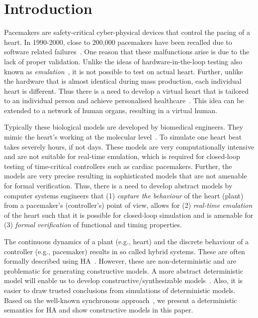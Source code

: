 \section{Introduction}

Pacemakers are safety-critical cyber-physical devices 
that control the pacing of a heart.
In 1990-2000, close to 200,000 pacemakers have been recalled
due to software related failures~\cite{alemzadeh13}.
 One reason that these malfunctions
arise is due to the lack of proper validation.
Unlike the ideas of hardware-in-the-loop testing
also known as \emph {emulation}~\cite{patel2015survey},
it is not possible to test on actual heart.
Further, unlike the hardware that is almost identical 
during mass production, each individual heart is different.
Thus there is a need to develop a virtual heart that is tailored
to an individual person and achieve
personalised healthcare~\cite{Trayanova2014}. 
This idea can be extended 
to a network of human organs, resulting in a virtual human.

Typically these biological  models are  developed by biomedical engineers.
They mimic the heart's working at the
molecular level~\cite{Trayanova2014}. 
To simulate one heart beat takes severely hours, if not days.
These models are very computationally intensive and 
are not suitable for real-time emulation,
which is required for closed-loop testing of time-critical 
controllers such as cardiac pacemakers.
Further, the models are 
 very precise resulting in sophisticated models that 
 are not amenable for  formal verification. 
Thus, there is a need to develop abstract models 
by computer systems engineers that  
(1)  \emph{capture the behaviour} of the heart (plant) 
from a pacemaker's (controller's) point of view,
allows for (2) \emph{real-time emulation} of the heart 
such that it is possible for closed-loop simulation and
is amenable for (3) \emph{formal verification} of 
functional and timing properties.


The continuous dynamics of a plant (e.g., heart) and
 the discrete behaviour of a controller (e.g., pacemaker) 
 results in so called hybrid systems. 
 These are often formally described using \acf{HA}~\cite{alur2015principles,raskin05,chen201487}.
 However, these are non-deterministic and are problematic
 for generating constructive models.
 A more abstract deterministic model will enable us to
 develop constructive/synthesizable models~\cite{Lee2014}. Also, 
 it is easier to draw trusted conclusions from simulations
 of deterministic models. Based on the
 well-known synchronous approach~\cite{benveniste03}, 
 we present a deterministic semantics for \ac{HA} and show
 constructive models in this paper.


